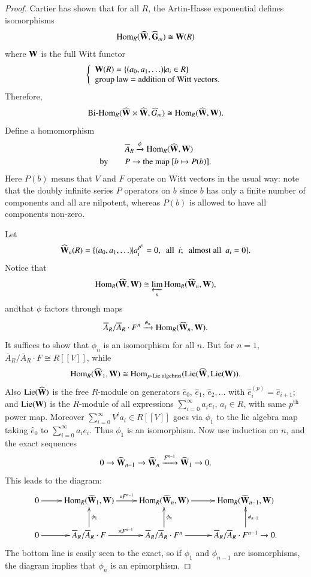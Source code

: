 \begin{proof}
Cartier \cite{art15-key1} has shown that for all $R$, the Artin-Hasse exponential defines isomorphisms
$$
\operatorname{\mathrm{Hom}}_{R}(\widehat{\mathbf{W}},\widehat{\mathbf{G}}_{m})\cong \mathbf{W}(R)
$$
where $\mathbf{W}$ is the full Witt functor
$$
\left\{
\begin{array}{l}
\mathbf{W}(R)=\{(a_{0},a_{1},\ldots)|a_{i}\in R\}\\
\text{group law = addition of Witt vectors.}
\end{array}
\right.
$$
Therefore,
$$
\text{\rm Bi-Hom}_{R}(\widehat{\mathbf{W}}\times \widehat{\mathbf{W}}, \widehat{G}_{m})\cong \operatorname{\mathrm{Hom}}_{R}(\widehat{\mathbf{W}},\mathbf{W}).
$$
Define a homomorphism
\begin{align*}
&\overline{A}_{R}\xrightarrow{\phi}\operatorname{\mathrm{Hom}}_{R}(\widehat{\mathbf{W}},\mathbf{W})\\
\text{by}\qquad & P\to \text{the map } [b\mapsto P(b)].
\end{align*}
Here $P(b)$ means that $V$ and $F$ operate on Witt vectors in the usual way: note that the doubly infinite series $P$ operators on $b$ since $b$ has only a finite number of components and all are nilpotent, whereas $P(b)$ is allowed to have all components non-zero.

Let
$$
\widehat{\mathbf{W}}_{n}(R)=\{(a_{0},a_{1},\ldots)|a^{p^{n}}_{i}=0,\text{~ all~ } i;\text{~ almost all~ } a_{i}=0\}.
$$
Notice that
$$
\operatorname{\mathrm{Hom}}_{R}(\widehat{\mathbf{W}},\mathbf{W})\cong \varprojlim_{n}\operatorname{\mathrm{Hom}}_{R}(\widehat{\mathbf{W}}_{n},\mathbf{W}),
$$
and\pageoriginale that $\phi$ factors through maps
$$
\overline{A}_{R}/\overline{A}_{R}\cdot F^{n}\xrightarrow{\phi_{n}}\operatorname{\mathrm{Hom}}_{R}(\widehat{\mathbf{W}}_{n},\mathbf{W}).
$$
It suffices to show that $\phi_{n}$ is an isomorphism for all $n$. But for $n=1$, $\overline{A}_{R}/\overline{A}_{R}\cdot F\cong R[[V]]$, while
$$
\operatorname{\mathrm{Hom}}_{R}(\widehat{\mathbf{W}}_{1},\mathbf{W})\cong \operatorname{\mathrm{Hom}}_{p\text{-Lie algebras}}(\operatorname{\mathrm{Lie}} (\widehat{\mathbf{W}},\operatorname{\mathrm{Lie}}(\mathbf{W})).
$$
Also $\operatorname{\mathrm{Lie}}(\widehat{\mathbf{W}})$ is the free $R$-module on generators $\widehat{e}_{0}$, $\widehat{e}_{1}$, $\widehat{e}_{2},\ldots$ with $\widehat{e}_{i}^{(p)}=\widehat{e}_{i+1}$; and $\operatorname{\mathrm{Lie}}(\mathbf{W})$ is the $R$-module of all expressions $\sum\limits^{\infty}_{i=0}a_{i}e_{i}$, $a_{i}\in R$, with same $p^{\text{th}}$ power map. Moreover $\sum\limits^{\infty}_{i=0} V^{i}a_{i}\in R[[V]]$ goes via $\phi_{1}$ to the lie algebra map taking $\widehat{e}_{0}$ to $\sum\limits^{\infty}_{i=0}a_{i}e_{i}$. Thus $\phi_{1}$ is an isomorphism. Now use induction on $n$, and the exact sequences 
$$
0\to \widehat{\mathbf{W}}_{n-1}\to \widehat{\mathbf{W}}_{n}\xrightarrow{F^{n-1}}\widehat{\mathbf{W}}_{1}\to 0.
$$
This leads to the diagram:
\[
\xymatrix{
0\ar[r] & \Hom_{R}(\widehat{\bfW}_{1},\bfW)\ar[r]^-{\circ F^{n-1}} & \Hom_{R}(\widehat{\bfW}_{n},\bfW)\ar[r] & \Hom_{R}(\widehat{\bfW}_{n-1},\bfW)\\
0\ar[r] & \overline{A}_{R}/\overline{A}_{R}\cdot F\ar[r]^-{\times F^{n-1}}\ar[u]_-{\phi_{1}} & \overline{A}_{R}/\overline{A}_{R}\cdot F^{n}\ar[u]_-{\phi_{n}}\ar[r] & \overline{A}_{R}/\overline{A}_{R}\cdot F^{n-1}\to 0.\ar[u]_-{\phi_{n-1}}  
}
\]
The bottom line is easily seen to the exact, so if $\phi_{1}$ and $\phi_{n-1}$ are isomorphisms, the diagram implies that $\phi_{n}$ is an epimorphism.
\end{proof}

